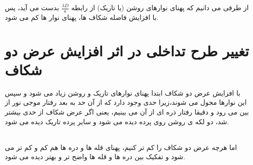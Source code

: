 \documentclass{article}
\begin{document}
\noindent
از طرفی می دانیم که پهنای نوارهای روشن (یا تاریک) از رابطه 
$\frac{\lambda D}{a}$
بدست می آید، پس با افزایش فاصله شکاف ها، پهنای نوار ها کم می شود.
\section{تغییر طرح تداخلی در اثر افزایش عرض دو شکاف}
با افزایش عرض دو شکاف ابتدا پهنای نوارهای تاریک و روشن زیاد می شود و سپس این نوارها محول می شوند،زیرا حدی وجود دارد که از آن حد به بعد رفتار موجی نور  از بین می رود و دقیقا رفتار ذره ای از آن می بینیم، یعنی اگر عرض شکاف از حدی بیشتر شد، دو لکه ی روشن روی پرده دیده می شود و سایر پرده تاریک دیده می شود.


\noindent \\
اما هرچه عرض دو شکاف را کم تر کنیم، پهنای قله ها و دره ها هم کم و کم تر می شود و تفکیک بین دره ها و قله ها واضح تر و بهتر دیده می شود. 
\end{document}
